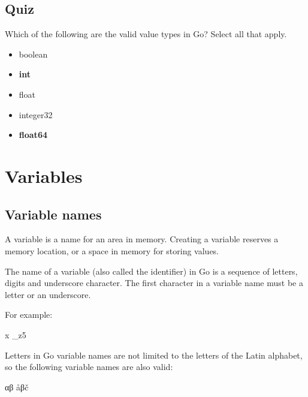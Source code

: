 \documentclass[]{book}
\newenvironment{Shaded}{\begin{snugshade}}{\end{snugshade}}
\newcommand{\NormalTok}[1]{#1}
\providecommand{\tightlist}{%
  \setlength{\itemsep}{0pt}\setlength{\parskip}{0pt}}
\begin{document}
\hypertarget{quiz-8}{%
\subsection*{Quiz}\label{quiz-8}}

Which of the following are the valid value types in Go? Select all that apply.

\begin{itemize}
\tightlist
\item
  boolean
\item
  \textbf{int}
\item
  float
\item
  integer32
\item
  \textbf{float64}
\end{itemize}

\hypertarget{variables}{%
\section{Variables}\label{variables}}

\hypertarget{variable-names}{%
\subsection{Variable names}\label{variable-names}}

A variable is a name for an area in memory. Creating a variable reserves a
memory location, or a space in memory for storing values.

The name of a variable (also called the identifier) in Go is a sequence of
letters, digits and underscore character. The first character in a variable
name must be a letter or an underscore.

For example:

\begin{Shaded}
\begin{Highlighting}[]
\NormalTok{x}
\NormalTok{_z5}
\end{Highlighting}
\end{Shaded}

Letters in Go variable names are not limited to the letters of the Latin
alphabet, so the following variable names are also valid:

\begin{Shaded}
\begin{Highlighting}[]
\NormalTok{αβ}
\NormalTok{åβč}
\end{Highlighting}
\end{Shaded}
\end{document}
